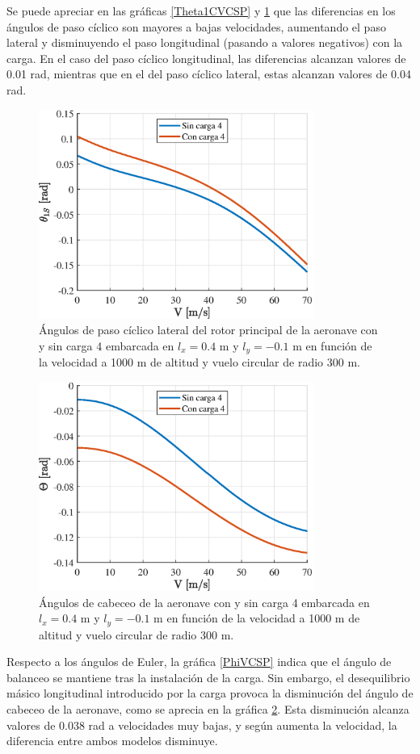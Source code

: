 Se puede apreciar en las gráficas \ref{Theta1CVCSP} y \ref{Theta1SVCSP} que las diferencias en los ángulos de paso cíclico son mayores a bajas velocidades, aumentando el paso lateral y disminuyendo el paso longitudinal (pasando a valores negativos) con la carga. En el caso del paso cíclico longitudinal, las diferencias alcanzan valores de 0.01 rad, mientras que en el del paso cíclico lateral, estas alcanzan valores de 0.04 rad.
\begin{figure}
	\centering
	\includegraphics[width=90mm]{graficos/theta1SVCSP}
	\caption{Ángulos de paso cíclico lateral del rotor principal de la aeronave con y sin carga 4 embarcada en $l_x=0.4$ m y $l_y=-0.1$ m en función de la velocidad a 1000 m de altitud y vuelo circular de radio 300 m.}
	\label{Theta1SVCSP}
\end{figure}
\begin{figure}
	\centering
	\includegraphics[width=90mm]{graficos/CabVCSP}
	\caption{Ángulos de cabeceo de la aeronave con y sin carga 4 embarcada en $l_x=0.4$ m y $l_y=-0.1$ m en función de la velocidad a 1000 m de altitud y vuelo circular de radio 300 m.}
	\label{ThetaVCSP}
\end{figure}

Respecto a los ángulos de Euler, la gráfica \ref{PhiVCSP} indica que el ángulo de balanceo se mantiene tras la instalación de la carga. Sin embargo, el desequilibrio másico longitudinal introducido por la carga provoca la disminución del ángulo de cabeceo de la aeronave, como se aprecia en la gráfica \ref{ThetaVCSP}. Esta disminución alcanza valores de 0.038 rad a velocidades muy bajas, y según aumenta la velocidad, la diferencia entre ambos modelos disminuye.

